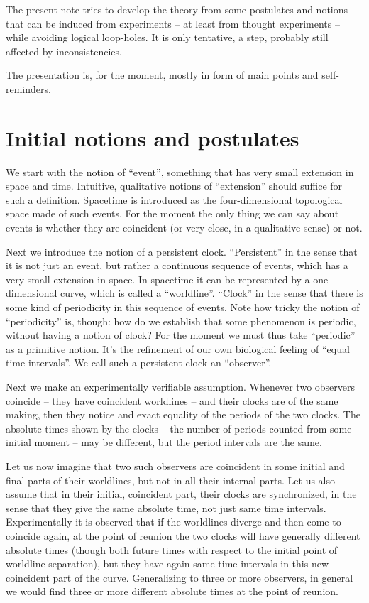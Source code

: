 \documentclass[\ifafour a4paper,12pt,\else a5paper,10pt,\fi%
onecolumn,oneside,article,%
british%
]{memoir}
\theoremstyle{remark}
\theoremstyle{innote}
\renewcommand*{\|}[1][]{\nonscript\:#1\vert\nonscript\:\mathopen{}}
\begin{document}
The present note tries to develop the theory from some postulates and notions that can be induced from experiments -- at least from thought experiments -- while avoiding logical loop-holes. It is only tentative, a step, probably still affected by inconsistencies.

The presentation is, for the moment, mostly in form of main points and self-reminders.

\section{Initial notions and postulates}
\label{sec:primitives}

We start with the notion of \enquote{event}, something that has very small extension in space and time. Intuitive, qualitative notions of \enquote{extension} should suffice for such a definition. Spacetime is introduced as the four-dimensional topological space made of such events. For the moment the only thing we can say about events is whether they are coincident (or very close, in a qualitative sense) or not.

Next we introduce the notion of a persistent clock. \enquote{Persistent} in the sense that it is not just an event, but rather a continuous sequence of events, which has a very small extension in space. In spacetime it can be represented by a one-dimensional curve, which is called a \enquote{worldline}. \enquote{Clock} in the sense that there is some kind of periodicity in this sequence of events. Note how tricky the notion of \enquote{periodicity} is, though: how do we establish that some phenomenon is periodic, without having a notion of clock? For the moment we must thus take \enquote{periodic} as a primitive notion. It's the refinement of our own biological feeling of \enquote{equal time intervals}. We call such a persistent clock an \enquote{observer}.

Next we make an experimentally verifiable assumption. Whenever two observers coincide -- they have coincident worldlines -- and their clocks are of the same making, then they notice and exact equality of the periods of the two clocks. The absolute times shown by the clocks -- the number of periods counted from some initial moment -- may be different, but the period intervals are the same.

Let us now imagine that two such observers are coincident in some initial and final parts of their worldlines, but not in all their internal parts. Let us also assume that in their initial, coincident part, their clocks are synchronized, in the sense that they give the same absolute time, not just same time intervals. Experimentally it is observed that if the worldlines diverge and then come to coincide again, at the point of reunion the two clocks will have generally different absolute times (though both future times with respect to the initial point of worldline separation), but they have again same time intervals in this new coincident part of the curve. Generalizing to three or more observers, in general we would find three or more different absolute times at the point of reunion.
\end{document}
